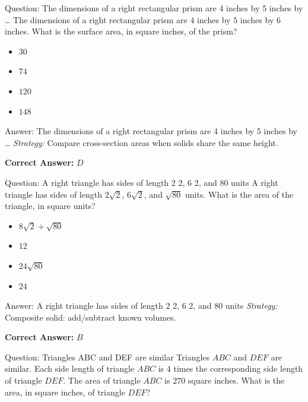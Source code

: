 \documentclass{beamer}
\begin{document}
\begin{frame}{Question: The dimensions of a right rectangular prism are 4 inches by 5 inches by …}
The dimensions of a right rectangular prism are $4$ inches by $5$ inches by $6$ inches.  
What is the surface area, in square inches, of the prism?
\begin{itemize}
    \item[\textbf{A.}] $30$
    \item[\textbf{B.}] $74$
    \item[\textbf{C.}] $120$
    \item[\textbf{D.}] $148$
\end{itemize}
\end{frame}
\begin{frame}{Answer: The dimensions of a right rectangular prism are 4 inches by 5 inches by …}
\textit{Strategy:} Compare cross-section areas when solids share the same height.

\textbf{Correct Answer:} \( \boxed{D} \)

\end{frame}
\begin{frame}{Question: A right triangle has sides of length 2 2, 6 2, and 80 units}
A right triangle has sides of length $2\sqrt{2}$, $6\sqrt{2}$, and $\sqrt{80}$ units.  
What is the area of the triangle, in square units?
\begin{itemize}
    \item[\textbf{A.}] $8\sqrt{2} + \sqrt{80}$
    \item[\textbf{B.}] $12$
    \item[\textbf{C.}] $24\sqrt{80}$
    \item[\textbf{D.}] $24$
\end{itemize}
\end{frame}
\begin{frame}{Answer: A right triangle has sides of length 2 2, 6 2, and 80 units}
\textit{Strategy:} Composite solid: add/subtract known volumes.

\textbf{Correct Answer:} \( \boxed{B} \)

\end{frame}
\begin{frame}{Question: Triangles ABC and DEF are similar}
Triangles $ABC$ and $DEF$ are similar.  
Each side length of triangle $ABC$ is $4$ times the corresponding side length of triangle $DEF$.  
The area of triangle $ABC$ is $270$ square inches.  
What is the area, in square inches, of triangle $DEF$?
\end{frame}
\end{document}
